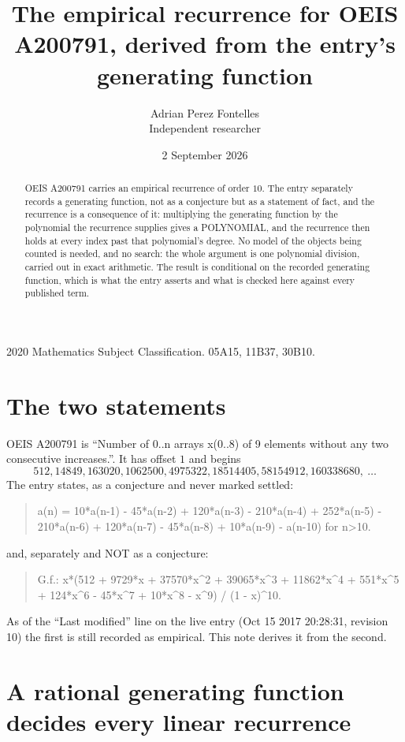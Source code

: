 \documentclass[11pt,a4paper]{article}
\title{The empirical recurrence for OEIS A200791, derived from the entry's generating function}
\author{Adrian Perez Fontelles\\ \small Independent researcher}
\date{2 September 2026}
\theoremstyle{plain}
\theoremstyle{definition}
\begin{document}
\maketitle

\begin{abstract}
OEIS A200791 carries an empirical recurrence of order $10$. The entry separately records a
generating function, not as a conjecture but as a statement of fact, and the recurrence is a
consequence of it: multiplying the generating function by the polynomial the recurrence
supplies gives a POLYNOMIAL, and the recurrence then holds at every index past that
polynomial's degree. No model of the objects being counted is needed, and no search: the
whole argument is one polynomial division, carried out in exact arithmetic. The result is
conditional on the recorded generating function, which is what the entry asserts and what is
checked here against every published term.
\end{abstract}

\noindent\small 2020 Mathematics Subject Classification. 05A15, 11B37, 30B10.\normalsize

\section{The two statements}

OEIS A200791 is ``Number of 0..n arrays x(0..8) of 9 elements without any two consecutive increases.''. It has offset $1$ and begins
\[
512, 14849, 163020, 1062500, 4975322, 18514405, 58154912, 160338680,\ \dots
\]
The entry states, as a conjecture and never marked settled:
\begin{quote}
a(n) = 10*a(n-1) - 45*a(n-2) + 120*a(n-3) - 210*a(n-4) + 252*a(n-5) - 210*a(n-6) + 120*a(n-7) - 45*a(n-8) + 10*a(n-9) - a(n-10) for n>10.
\end{quote}
and, separately and NOT as a conjecture:
\begin{quote}
G.f.: x*(512 + 9729*x + 37570*x\^{}2 + 39065*x\^{}3 + 11862*x\^{}4 + 551*x\^{}5 + 124*x\^{}6 - 45*x\^{}7 + 10*x\^{}8 - x\^{}9) / (1 - x)\^{}10.
\end{quote}
As of the ``Last modified'' line on the live entry (Oct 15 2017 20:28:31, revision 10) the first is still
recorded as empirical. This note derives it from the second.

\section{A rational generating function decides every linear recurrence}
\end{document}
